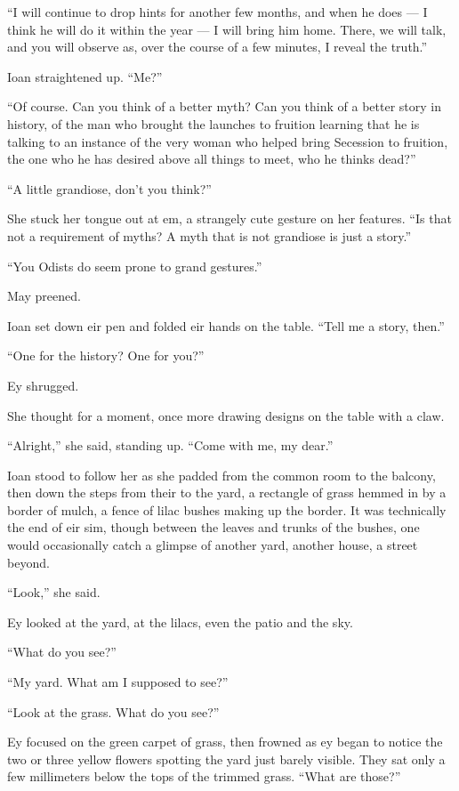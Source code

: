 ``I will continue to drop hints for another few months, and when he does — I think he will do it within the year — I will bring him home. There, we will talk, and you will observe as, over the course of a few minutes, I reveal the truth.''

Ioan straightened up. ``Me?''

``Of course. Can you think of a better myth? Can you think of a better story in history, of the man who brought the launches to fruition learning that he is talking to an instance of the very woman who helped bring Secession to fruition, the one who he has desired above all things to meet, who he thinks dead?''

``A little grandiose, don't you think?''

She stuck her tongue out at em, a strangely cute gesture on her features. ``Is that not a requirement of myths? A myth that is not grandiose is just a story.''

``You Odists do seem prone to grand gestures.''

May preened.

Ioan set down eir pen and folded eir hands on the table. ``Tell me a story, then.''

``One for the history? One for you?''

Ey shrugged.

She thought for a moment, once more drawing designs on the table with a claw.

``Alright,'' she said, standing up. ``Come with me, my dear.''

Ioan stood to follow her as she padded from the common room to the balcony, then down the steps from their to the yard, a rectangle of grass hemmed in by a border of mulch, a fence of lilac bushes making up the border. It was technically the end of eir sim, though between the leaves and trunks of the bushes, one would occasionally catch a glimpse of another yard, another house, a street beyond.

``Look,'' she said.

Ey looked at the yard, at the lilacs, even the patio and the sky.

``What do you see?''

``My yard. What am I supposed to see?''

``Look at the grass. What do you see?''

Ey focused on the green carpet of grass, then frowned as ey began to notice the two or three yellow flowers spotting the yard just barely visible. They sat only a few millimeters below the tops of the trimmed grass. ``What are those?''

